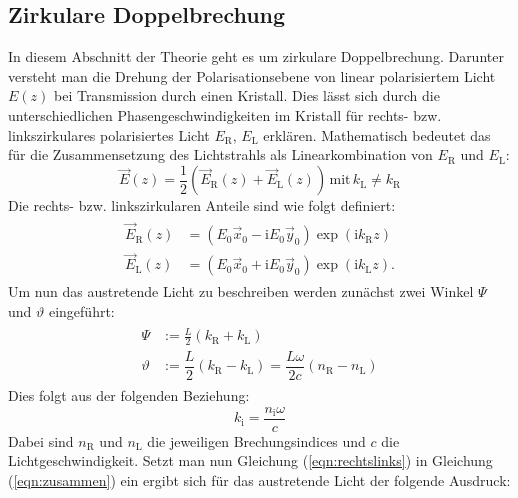 \subsection{Zirkulare Doppelbrechung}
\label{sec:zirkulare_doppelbrechung}
In diesem Abschnitt der Theorie geht es um zirkulare Doppelbrechung. Darunter versteht man die Drehung der Polarisationsebene von linear polarisiertem Licht $E(z)$ bei Transmission durch einen Kristall.
Dies lässt sich durch die unterschiedlichen Phasengeschwindigkeiten im Kristall für rechts- bzw. linkszirkulares polarisiertes Licht $E_\mathrm{R}$, $E_\mathrm{L}$ erklären. Mathematisch bedeutet das für
die Zusammensetzung des Lichtstrahls als Linearkombination von $E_\mathrm{R}$ und $E_\mathrm{L}$:
\begin{equation}
  \label{eqn:zusammen}
  \vec{E}(z)=\dfrac{1}{2}(\vec{E}_\mathrm{R}(z)+\vec{E}_\mathrm{L}(z)) \, \mathrm{mit} \, k_\mathrm{L}\neq k_\mathrm{R}
\end{equation}
Die rechts- bzw. linkszirkularen Anteile sind wie folgt definiert:
\begin{align}
  \label{eqn:rechtslinks}
  \begin{aligned}
  \vec{E}_\mathrm{R}(z) &= \left(E_\mathrm{0} \vec{x}_\mathrm{0} - \mathrm{i}E_\mathrm{0}\vec{y}_\mathrm{0}\right)\exp\left(\mathrm{i}{k}_\mathrm{R}z\right)\\
  \vec{E}_\mathrm{L}(z) &= \left(E_\mathrm{0} \vec{x}_\mathrm{0} + \mathrm{i}E_\mathrm{0}\vec{y}_\mathrm{0}\right)\exp\left(\mathrm{i}{k}_\mathrm{L}z\right).
\end{aligned}
\end{align}
Um nun das austretende Licht zu beschreiben werden zunächst zwei Winkel $\Psi$ und $\vartheta$ eingeführt:
\begin{align}
  \label{eqn:winkel}
  \begin{aligned}
    \Psi&:=\frac{L}{2}(k_\mathrm{R}+k_\mathrm{L}) \\
    \vartheta &:= \dfrac{L}{2}(k_\mathrm{R}-k_\mathrm{L}) = \dfrac{L\omega}{2c}\left(n_\mathrm{R}-n_\mathrm{L}\right)
  \end{aligned}
\end{align}
Dies folgt aus der folgenden Beziehung:
\begin{equation*}
   k_\mathrm{i}=\frac{n_\mathrm{i}\omega}{c}
\end{equation*}
Dabei sind $n_\mathrm{R}$ und $n_\mathrm{L}$ die jeweiligen Brechungsindices und $c$ die Lichtgeschwindigkeit.
Setzt man nun Gleichung (\ref{eqn:rechtslinks}) in Gleichung (\ref{eqn:zusammen}) ein ergibt sich für das austretende Licht der folgende Ausdruck:
